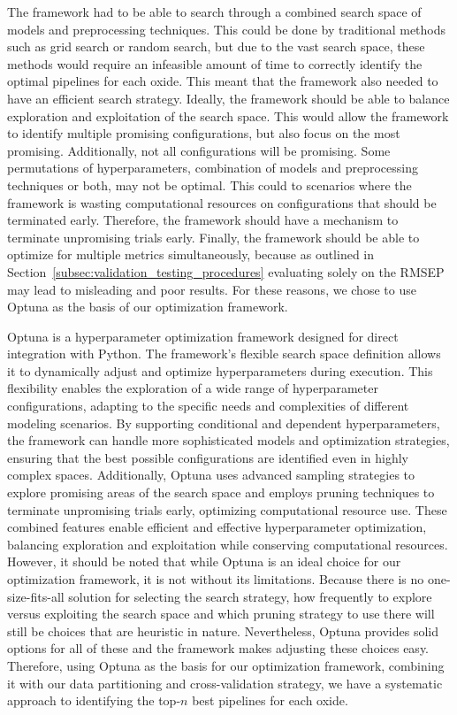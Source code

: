 The framework had to be able to search through a combined search space of models and preprocessing techniques.
This could be done by traditional methods such as grid search or random search, but due to the vast search space, these methods would require an infeasible amount of time to correctly identify the optimal pipelines for each oxide.
This meant that the framework also needed to have an efficient search strategy.
Ideally, the framework should be able to balance exploration and exploitation of the search space.
This would allow the framework to identify multiple promising configurations, but also focus on the most promising.
Additionally, not all configurations will be promising. 
Some permutations of hyperparameters, combination of models and preprocessing techniques or both, may not be optimal.
This could to scenarios where the framework is wasting computational resources on configurations that should be terminated early.
Therefore, the framework should have a mechanism to terminate unpromising trials early.
Finally, the framework should be able to optimize for multiple metrics simultaneously, because as outlined in Section~\ref{subsec:validation_testing_procedures} evaluating solely on the RMSEP may lead to misleading and poor results.
For these reasons, we chose to use Optuna as the basis of our optimization framework.

Optuna is a hyperparameter optimization framework designed for direct integration with Python.
The framework's flexible search space definition allows it to dynamically adjust and optimize hyperparameters during execution. 
This flexibility enables the exploration of a wide range of hyperparameter configurations, adapting to the specific needs and complexities of different modeling scenarios. 
By supporting conditional and dependent hyperparameters, the framework can handle more sophisticated models and optimization strategies, ensuring that the best possible configurations are identified even in highly complex spaces.
Additionally, Optuna uses advanced sampling strategies to explore promising areas of the search space and employs pruning techniques to terminate unpromising trials early, optimizing computational resource use. These combined features enable efficient and effective hyperparameter optimization, balancing exploration and exploitation while conserving computational resources. \cite{optuna_2019}
However, it should be noted that while Optuna is an ideal choice for our optimization framework, it is not without its limitations.
Because there is no one-size-fits-all solution for selecting the search strategy, how frequently to explore versus exploiting the search space and which pruning strategy to use there will still be choices that are heuristic in nature.
Nevertheless, Optuna provides solid options for all of these and the framework makes adjusting these choices easy.
Therefore, using Optuna as the basis for our optimization framework, combining it with our data partitioning and cross-validation strategy, we have a systematic approach to identifying the top-$n$ best pipelines for each oxide.

